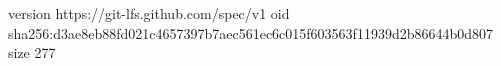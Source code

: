 version https://git-lfs.github.com/spec/v1
oid sha256:d3ae8eb88fd021c4657397b7aec561ec6c015f603563f11939d2b86644b0d807
size 277

